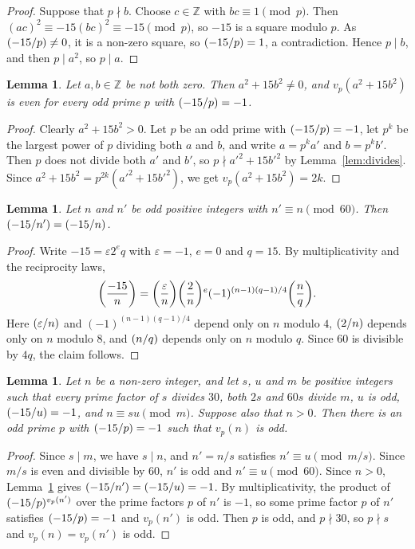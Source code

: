 \documentclass[11pt]{article}
\newtheorem{lemma}[theorem]{Lemma}
\newcommand{\Z}{\mathbb{Z}}
\newcommand{\leg}[2]{\mathchoice{\biggl(\dfrac{#1}{#2}\biggr)}{(#1/#2)}{(#1/#2)}{(#1/#2)}}
\begin{document}
\begin{proof}
Suppose that $p\nmid b$. Choose $c\in\Z$ with $bc\equiv1\pmod p$. Then $(ac)^2\equiv-15(bc)^2\equiv-15\pmod p$, so $-15$ is a square modulo $p$. As $\leg{-15}{p}\neq0$, it is a non-zero square, so $\leg{-15}{p}=1$, a contradiction. Hence $p\mid b$, and then $p\mid a^2$, so $p\mid a$.
\end{proof}

\begin{lemma}\label{lem:even}
Let $a,b\in\Z$ be not both zero. Then $a^2+15b^2\neq0$, and $v_p(a^2+15b^2)$ is even for every odd prime $p$ with $\leg{-15}{p}=-1$.
\end{lemma}

\begin{proof}
Clearly $a^2+15b^2>0$. Let $p$ be an odd prime with $\leg{-15}{p}=-1$, let $p^k$ be the largest power of $p$ dividing both $a$ and $b$, and write $a=p^ka'$ and $b=p^kb'$. Then $p$ does not divide both $a'$ and $b'$, so $p\nmid a'^2+15b'^2$ by Lemma~\ref{lem:divides}. Since $a^2+15b^2=p^{2k}(a'^2+15b'^2)$, we get $v_p(a^2+15b^2)=2k$.
\end{proof}

\begin{lemma}\label{lem:period}
Let $n$ and $n'$ be odd positive integers with $n'\equiv n\pmod{60}$. Then $\leg{-15}{n'}=\leg{-15}{n}$.
\end{lemma}

\begin{proof}
Write $-15=\varepsilon2^eq$ with $\varepsilon=-1$, $e=0$ and $q=15$. By multiplicativity and the reciprocity laws,
\[
\leg{-15}{n}=\leg{\varepsilon}{n}\leg{2}{n}^e(-1)^{(n-1)(q-1)/4}\leg{n}{q}.
\]
Here $\leg{\varepsilon}{n}$ and $(-1)^{(n-1)(q-1)/4}$ depend only on $n$ modulo $4$, $\leg{2}{n}$ depends only on $n$ modulo $8$, and $\leg{n}{q}$ depends only on $n$ modulo $q$. Since $60$ is divisible by $4q$, the claim follows.
\end{proof}

\begin{lemma}\label{lem:odd}
Let $n$ be a non-zero integer, and let $s$, $u$ and $m$ be positive integers such that every prime factor of $s$ divides $30$, both $2s$ and $60s$ divide $m$, $u$ is odd, $\leg{-15}{u}=-1$, and $n\equiv su\pmod m$. Suppose also that $n>0$. Then there is an odd prime $p$ with $\leg{-15}{p}=-1$ such that $v_p(n)$ is odd.
\end{lemma}

\begin{proof}
Since $s\mid m$, we have $s\mid n$, and $n'=n/s$ satisfies $n'\equiv u\pmod{m/s}$. Since $m/s$ is even and divisible by $60$, $n'$ is odd and $n'\equiv u\pmod{60}$. Since $n>0$, Lemma~\ref{lem:period} gives $\leg{-15}{n'}=\leg{-15}{u}=-1$. By multiplicativity, the product of $\leg{-15}{p}^{v_p(n')}$ over the prime factors $p$ of $n'$ is $-1$, so some prime factor $p$ of $n'$ satisfies $\leg{-15}{p}=-1$ and $v_p(n')$ is odd. Then $p$ is odd, and $p\nmid30$, so $p\nmid s$ and $v_p(n)=v_p(n')$ is odd.
\end{proof}
\end{document}
